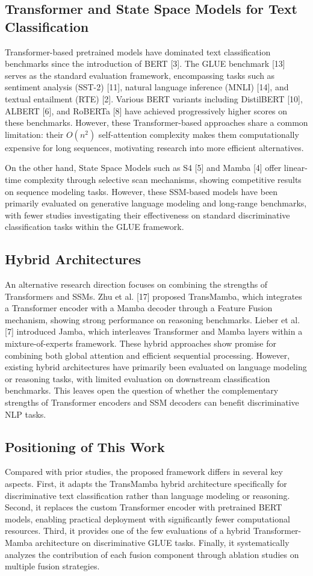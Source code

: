 \documentclass[runningheads]{llncs}
\begin{document}
\subsection{Transformer and State Space Models for Text Classification}
Transformer-based pretrained models have dominated text classification benchmarks since the introduction of BERT [3]. The GLUE benchmark [13] serves as the standard evaluation framework, encompassing tasks such as sentiment analysis (SST-2) [11], natural language inference (MNLI) [14], and textual entailment (RTE) [2]. Various BERT variants including DistilBERT [10], ALBERT [6], and RoBERTa [8] have achieved progressively higher scores on these benchmarks. However, these Transformer-based approaches share a common limitation: their $O(n^{2})$ self-attention complexity makes them computationally expensive for long sequences, motivating research into more efficient alternatives.

On the other hand, State Space Models such as S4 [5] and Mamba [4] offer linear-time complexity through selective scan mechanisms, showing competitive results on sequence modeling tasks. However, these SSM-based models have been primarily evaluated on generative language modeling and long-range benchmarks, with fewer studies investigating their effectiveness on standard discriminative classification tasks within the GLUE framework.

\subsection{Hybrid Architectures}
An alternative research direction focuses on combining the strengths of Transformers and SSMs. Zhu et al. [17] proposed TransMamba, which integrates a Transformer encoder with a Mamba decoder through a Feature Fusion mechanism, showing strong performance on reasoning benchmarks. Lieber et al. [7] introduced Jamba, which interleaves Transformer and Mamba layers within a mixture-of-experts framework. These hybrid approaches show promise for combining both global attention and efficient sequential processing. However, existing hybrid architectures have primarily been evaluated on language modeling or reasoning tasks, with limited evaluation on downstream classification benchmarks. This leaves open the question of whether the complementary strengths of Transformer encoders and SSM decoders can benefit discriminative NLP tasks.

\subsection{Positioning of This Work}
Compared with prior studies, the proposed framework differs in several key aspects. First, it adapts the TransMamba hybrid architecture specifically for discriminative text classification rather than language modeling or reasoning. Second, it replaces the custom Transformer encoder with pretrained BERT models, enabling practical deployment with significantly fewer computational resources. Third, it provides one of the few evaluations of a hybrid Transformer-Mamba architecture on discriminative GLUE tasks. Finally, it systematically analyzes the contribution of each fusion component through ablation studies on multiple fusion strategies.
\end{document}
